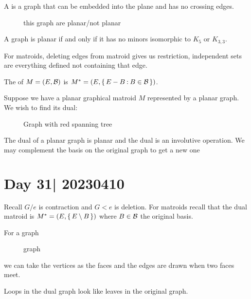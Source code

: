 \documentclass[12pt]{memoir}
\begin{document}
\begin{Def}
    A  is a graph that can be embedded into the plane and has no crossing edges.
\end{Def}

\begin{figure}
    this graph are planar/not planar
\end{figure}

\begin{Th}[Kuratowski]
    A graph is planar if and only if it has no minors isomorphic to $K_5$ or $K_{3,3}$.
\end{Th}

For matroids, deleting edges from matroid gives us restriction, independent sets are everything defined not containing that edge.\par 

\begin{Def}
    The  of $M=(E,\mathcal{B})$ is $M^\ast=(E,\{\,E-B\mathbin{:} B\in\mathcal{B}\,\})$.
\end{Def}

\begin{Ex}
    Suppose we have a planar graphical matroid $M$ represented by a planar graph. We wish to find its dual:
    \begin{figure}
        Graph with red spanning tree
    \end{figure}
    The dual of a planar graph is planar and the dual is an involutive operation. We may complement the basis on the original graph to get a new one
\end{Ex}

\section{Day 31| 20230410}

Recall $G/e$ is contraction and $G\less e$ is deletion. For matroids recall that the dual matroid is $M^\ast=(E,\{\,E\setminus B\,\})$ where $B\in\mathcal{B}$ the original basis.

\begin{Ex}
For a graph 
\begin{figure}
    graph
\end{figure}
we can take the vertices as the faces and the edges are drawn when two faces meet.\par 
Loops in the dual graph look like leaves in the original graph.
\end{Ex}
\end{document}

